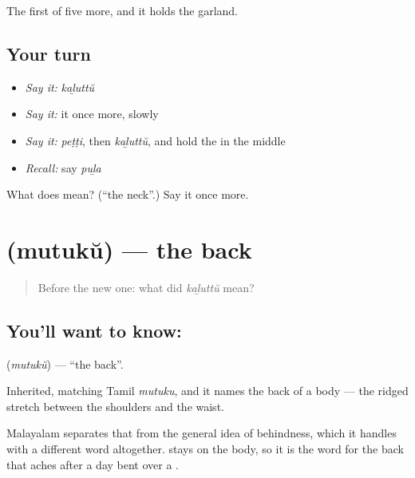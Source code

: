 \begin{grammarlens}[title={What you've built}]
The first of five more, and it holds the garland.
\end{grammarlens}

\subsection*{Your turn}
\begin{itemize}
\raggedright
  \item \emph{Say it:} \emph{kaḻuttŭ}
  \item \emph{Say it:} it once more, slowly
  \item \emph{Say it:} \emph{peṭṭi}, then \emph{kaḻuttŭ}, and hold the  in the middle
  \item \emph{Recall:} say \emph{puḻa}
\end{itemize}

\begin{tcolorbox}[breakable,colback=teal!4,colframe=teal!35!black,title={Before you move on}]
What does  mean? (\textquotedblleft{}the neck\textquotedblright{}.) Say it once more.
\end{tcolorbox}
\section[\texorpdfstring{\ml{മുതുക്} (mutukŭ)}{മുതുക് (mutukŭ)}]{ (mutukŭ) — the back}

\label{lesson:ML-C57-back}



\begin{quote}
Before the new one: what did \emph{kaḻuttŭ} mean?
\end{quote}

\subsection*{You'll want to know: }
\textbf{} (\emph{mutukŭ}) — \textquotedblleft{}the back\textquotedblright{}.

Inherited, matching Tamil \emph{mutuku}, and it names the back of a body — the ridged stretch between the shoulders and the waist.

Malayalam separates that from the general idea of behindness, which it handles with a different word altogether.  stays on the body, so it is the word for the back that aches after a day bent over a .

